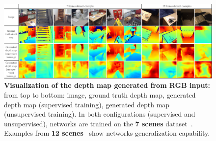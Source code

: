\begin{landscape}
\begin{figure}
    \centering
    
	\includegraphics[trim={96 0 0 0},clip,width=\linewidth]{results/indoor/depth_maps}
	\caption[Generated indoor depth maps]{\label{fig:depth_map_indoor} \textbf{Visualization of the depth map generated from RGB input:} from top to bottom: image, ground truth depth map, generated depth map (supervised training), generated depth map (unsupervised training). In both configurations (supervised and unsupervised), networks are trained on the \textbf{7 scenes} dataset~\citep{Shotton2013}. Examples from \textbf{12 scenes}~\citep{Valentin2016} show networks generalization capability.}

\end{figure}
\end{landscape}

